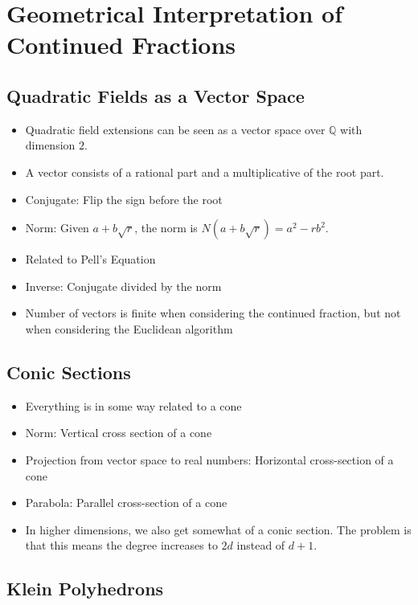 \chapter{Geometrical Interpretation of Continued Fractions}

\section{Quadratic Fields as a Vector Space}

\begin{itemize}
  \item Quadratic field extensions can be seen as a vector space over $ℚ$ with dimension $2$.
  \item A vector consists of a rational part and a multiplicative of the root part.
  \item Conjugate: Flip the sign before the root
  \item Norm: Given $a + b\sqrt{r}$, the norm is $N(a + b \sqrt{r}) = a^2 - r b^2$.
  \item Related to Pell's Equation
  \item Inverse: Conjugate divided by the norm
  \item Number of vectors is finite when considering the continued fraction,
    but not when considering the Euclidean algorithm
\end{itemize}

\section{Conic Sections}

\begin{itemize}
  \item
    Everything is in some way related to a cone
  \item
    Norm:
    Vertical cross section of a cone
  \item
    Projection from vector space to real numbers:
    Horizontal cross-section of a cone
  \item
    Parabola: Parallel cross-section of a cone
  \item
    In higher dimensions, we also get somewhat of a conic section.
    The problem is that this means the degree increases to $2d$ instead of $d+1$.
\end{itemize}

\section{Klein Polyhedrons}

